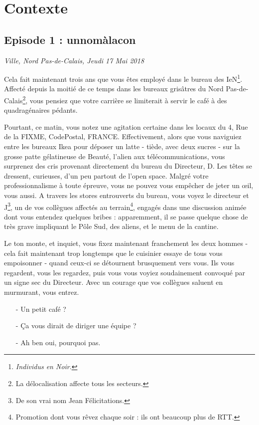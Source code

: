 \newpage

\section{Contexte}
\subsection{Episode 1 : unnomàlacon}
\hfill \textit{Ville, Nord Pas-de-Calais, Jeudi 17 Mai 2018}

Cela fait maintenant trois ans que vous êtes employé dans le bureau des
IeN\footnote{\emph{Individus en Noir}\texttrademark.}.  Affecté depuis la moitié
de ce temps dans les bureaux grisâtres du Nord Pas-de-Calais\footnote{La
délocalisation affecte tous les secteurs.}, vous pensiez que votre carrière se
limiterait à servir le café à des quadragénaires pédants. 

Pourtant, ce matin, vous notez une agitation certaine dans les locaux du 4, Rue
de la FIXME, CodePostal, FRANCE. %
Effectivement, alors que vous naviguiez entre les bureaux Ikea
pour déposer un latte - tiède, avec deux sucres - sur la grosse patte
gélatineuse de Beauté, l'alien aux télécommunications, vous surprenez des cris
provenant directement du bureau du Directeur, D. Les têtes se dressent,
curieuses, d'un peu partout de l'open space. Malgré votre professionnalisme à
toute épreuve, vous ne pouvez vous empêcher de jeter un œil, vous aussi. A
travers les stores entrouverts du bureau, vous voyez le directeur et
J\footnote{De son vrai nom Jean Félicitations.}, un de vos collègues affectés au
terrain\footnote{Promotion dont vous rêvez chaque soir : ils ont beaucoup plus
de RTT.}, engagés dans une discussion animée dont vous entendez quelques bribes
: apparemment, il se passe quelque chose de très grave impliquant le Pôle Sud,
des aliens, et le menu de la cantine.

Le ton monte, et inquiet, vous fixez maintenant franchement les deux hommes -
cela fait maintenant trop longtemps que le cuisinier essaye de tous vous
empoisonner - quand ceux-ci se détournent brusquement vers vous. Ils vous
regardent, vous les regardez, puis vous vous voyiez soudainement convoqué par un
signe sec du Directeur. Avec un courage que vos collègues saluent en murmurant,
vous entrez.

\begin{itemize}
\item[-] Un petit café ?
\item[-] Ça vous dirait de diriger une équipe ?
\item[-] Ah ben oui, pourquoi pas.
\end{itemize}

